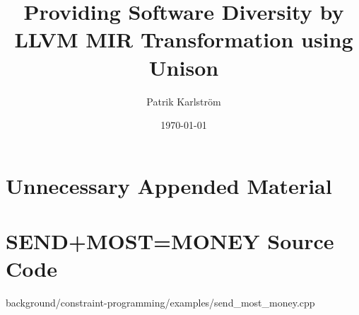 \documentclass{kththesis}
\title{Providing Software Diversity by LLVM MIR Transformation using Unison}
\author{Patrik Karlström}
\date{\today}
\begin{document}
\frontmatter

\titlepage






\tableofcontents


\mainmatter







\printbibliography[heading=bibintoc] %

\appendix

\chapter{Unnecessary Appended Material}

\chapter{SEND+MOST=MONEY Source Code}
\label{appendix:constraint_programming}

	{background/constraint-programming/examples/send_most_money.cpp}
\end{document}
